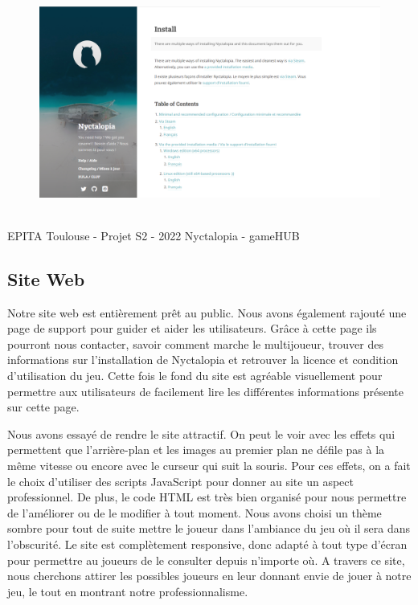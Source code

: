 \begin{figure}[H]
\centering
\begin{minipage}{.5\textwidth}
  \centering
  \centerline{\includegraphics[width=0.8\linewidth]{img/4.PNG}}
  \label{fig:manual}
\end{minipage}%
\end{figure}


\vfill
\noindent\makebox[\linewidth]{\rule{.8\paperwidth}{.6pt}}\\[0.2cm]
EPITA Toulouse - Projet S2 - 2022 \hfill Nyctalopia - gameHUB
\noindent\makebox[\linewidth]{\rule{.8\paperwidth}{.6pt}}
\newpage

\subsection{Site Web}
\setlength{\parindent}{5ex} 
Notre site web est entièrement prêt au public. 
Nous avons également rajouté une page de support pour guider et aider les utilisateurs. Grâce à cette page ils pourront  nous contacter, savoir comment marche le multijoueur, trouver des informations sur l'installation de Nyctalopia et retrouver la licence et condition d'utilisation du jeu. Cette fois le fond du site est agréable visuellement pour permettre aux utilisateurs de facilement lire les différentes informations présente sur cette page.

Nous avons essayé de rendre le site attractif. On peut le voir avec les effets qui permettent que l'arrière-plan et les images au premier plan ne défile pas à la même vitesse ou encore avec le curseur qui suit la souris. Pour ces effets, on a fait le choix d'utiliser des scripts JavaScript pour donner au site un aspect professionnel. De plus, le code HTML est très bien organisé pour nous permettre de l'améliorer ou de le modifier à tout moment. 
Nous avons choisi un thème sombre pour tout de suite mettre le joueur dans l'ambiance du jeu où il sera dans l'obscurité. 
Le site est complètement responsive, donc adapté à tout type d'écran pour permettre au joueurs de le consulter depuis n'importe où. 
A travers ce site, nous cherchons attirer les possibles joueurs en leur donnant envie de jouer à notre jeu, le tout en montrant notre professionnalisme.


